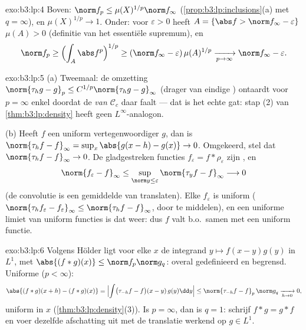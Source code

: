 \begin{solution}{exo:b3:lp:4}
Boven: $\norm f_p \leq \mu(X)^{1/p}\norm f_\infty$
(\cref{prop:b3:lp:inclusions}(a) met $q = \infty$), en
$\mu(X)^{1/p} \to 1$. Onder: voor $\varepsilon > 0$ heeft $A =
\{\abs f > \norm f_\infty - \varepsilon\}$  $\mu(A) > 0$
(definitie van het essentiële supremum), en
\[
\norm f_p \geq \Bigl(\int_A \abs f^p\Bigr)^{1/p}
\geq (\norm f_\infty - \varepsilon)\,\mu(A)^{1/p}
\xrightarrow[p\to\infty]{} \norm f_\infty - \varepsilon .
\]
\end{solution}

\begin{solution}{exo:b3:lp:5}
(a) Tweemaal: de omzetting $\norm{\tau_hg - g}_p \leq
C^{1/p}\norm{\tau_hg - g}_\infty$ (drager van eindige )
ontaardt voor $p = \infty$ enkel doordat de \emph{ van
$\mathcal C_c$} daar faalt --- dat is het echte gat: stap (2) van
\cref{thm:b3:lp:density} heeft geen $L^\infty$-analogon.

(b) Heeft $f$ een uniform  vertegenwoordiger $g$, dan is
$\norm{\tau_hf - f}_\infty = \sup_x\abs{g(x - h) - g(x)} \to 0$.
Omgekeerd, stel dat $\norm{\tau_hf - f}_\infty \to 0$. De
gladgestreken functies $f_\varepsilon = f * \rho_\varepsilon$
zijn , en
\[
\norm{f_\varepsilon - f}_\infty
\leq \sup_{\norm y \leq \varepsilon}\norm{\tau_yf -
f}_\infty \longrightarrow 0
\]
(de convolutie is een gemiddelde van translaten). Elke
$f_\varepsilon$ is uniform 
($\norm{\tau_hf_\varepsilon - f_\varepsilon}_\infty \leq
\norm{\tau_hf - f}_\infty$, door te middelen), en een uniforme
limiet van uniform  functies is dat weer: dus $f$ valt
b.o.\ samen met een uniform  functie.
\end{solution}

\begin{solution}{exo:b3:lp:6}
Volgens Hölder ligt voor elke $x$ de integrand $y \mapsto f(x -
y)g(y)$ in $L^1$, met $\abs{(f*g)(x)} \leq \norm f_p\norm g_q$:
overal gedefinieerd en begrensd. Uniforme  ($p <
\infty$):
\[
\abs{(f*g)(x + h) - (f*g)(x)}
= \Bigl|\int\bigl(\tau_{-h}f - f\bigr)(x - y)\,g(y)\dd y\Bigr|
\leq \norm{\tau_{-h}f - f}_p\,\norm g_q
\xrightarrow[h\to0]{} 0,
\]
uniform in $x$ (\cref{thm:b3:lp:density}(3)). Is $p = \infty$,
dan is $q = 1$: schrijf $f * g = g * f$ en voer dezelfde
afschatting uit met de translatie werkend op $g \in L^1$.
\end{solution}

